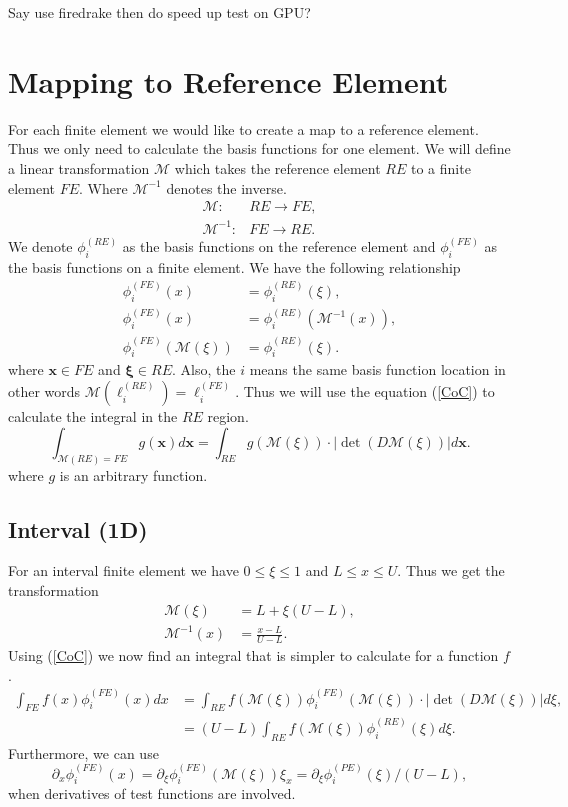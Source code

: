 \documentclass[12pt]{ociamthesis}
\begin{document}
Say use firedrake then do speed up test on GPU?

\section{Mapping to Reference Element} \label{RE}
For each finite element we would like to create a map to a reference element. Thus we only need to calculate the basis functions for one element. We will define a linear transformation $\mathcal{M}$ which takes the reference element $RE$ to a finite element $FE$. Where $\mathcal{M}^{-1}$ denotes the inverse. 
\begin{align}
\mathcal{M}: &RE \rightarrow FE, \\
\mathcal{M}^{-1}: &FE \rightarrow RE.
\end{align}
We denote $\phi_i^{(RE)}$ as the basis functions on the reference element and $\phi_i^{(FE)}$ as the basis functions on a finite element. We have the following relationship
\begin{align}
\phi_i^{(FE)}(x) &= \phi_i^{(RE)}(\xi), \\
\phi_i^{(FE)}(x) &= \phi_i^{(RE)}(\mathcal{M}^{-1}(x)), \\
\phi_i^{(FE)}(\mathcal{M}(\xi)) &= \phi_i^{(RE)}(\xi).
\end{align}
where $\mathbf{x} \in FE$ and $\mathbf{\xi} \in RE$. Also, the $i$ means the same basis function location in other words $\mathcal{M}(\ell_i^{(RE)}) = \ell_i^{(FE)}$. Thus we will use the equation (\ref{CoC}) to calculate the integral in the $RE$ region.
\begin{equation} \label{CoC}
\int_{\mathcal{M}(RE)=FE}g(\mathbf{x}) d\mathbf{x} =
\int_{RE}g(\mathcal{M(\xi)})\cdot |\det(D\mathcal{M}(\xi))| d\mathbf{x}.
\end{equation}
where $g$ is an arbitrary function.
\subsection{Interval (1D)}
For an interval finite element we have $0\leq\xi\leq1$ and $L \leq x \leq U$. Thus we get the transformation
\begin{align}
\mathcal{M}(\xi) &= L + \xi(U-L),\\
\mathcal{M}^{-1}(x) &= \frac{x-L}{U-L}.
\end{align}
Using (\ref{CoC}) we now find an integral that is simpler to calculate for a function $f$.
\begin{align}
\int_{FE} f(x)\phi_i^{(FE)}(x) dx &=
\int_{RE}f(\mathcal{M}(\xi))\phi_i^{(FE)}(\mathcal{M}(\xi))\cdot |\det(D\mathcal{M}(\xi))| d\xi, \\
&= (U-L) \int_{RE}f(\mathcal{M}(\xi)) \phi_i^{(RE)}(\xi) d\xi.
\end{align}
Furthermore, we can use 
\begin{equation}
\partial_x \phi_i^{(FE)}(x) =
\partial_{\xi}\phi_i^{(FE)}(\mathcal{M}(\xi)) \xi_x = 
\partial_{\xi}\phi_i^{(PE)}(\xi)/(U-L),
\end{equation}
when derivatives of test functions are involved.
\end{document}
